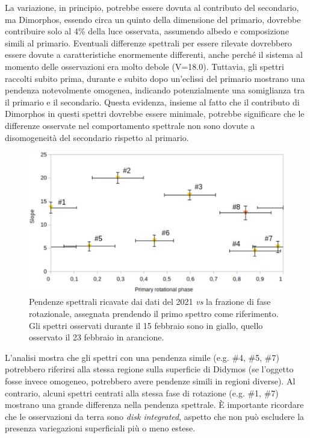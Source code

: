 La variazione, in principio, potrebbe essere dovuta al contributo del secondario, ma Dimorphos, essendo circa un quinto della dimensione del primario, dovrebbe contribuire solo al 4\% della luce osservata, assumendo albedo e composizione simili al primario. Eventuali differenze spettrali per essere rilevate dovrebbero essere dovute a caratteristiche enormemente differenti, anche perché il sistema al momento delle osservazioni era molto debole (V=18.0). Tuttavia, gli spettri raccolti subito prima, durante e subito dopo un'eclissi del primario mostrano una pendenza notevolmente omogenea, indicando potenzialmente una somiglianza tra il primario e il secondario. Questa evidenza, insieme al fatto che il contributo di Dimorphos in questi spettri dovrebbe essere minimale, potrebbe significare che le differenze osservate nel comportamento spettrale non sono dovute a disomogeneità del secondario rispetto al primario.

\begin{figure}[!h]
    \centering
    \includegraphics[scale=0.7]{figure/slope_ieva.jpg}
    \caption[Pendenze spettrali dei dati del 2021.]{Pendenze spettrali ricavate dai dati del 2021 \textit{vs} la frazione di fase rotazionale, assegnata prendendo il primo spettro come riferimento. Gli spettri osservati durante il 15 febbraio sono in giallo, quello osservato il 23 febbraio in arancione. \citep{ieva_spectral_2022}}
    \label{fig:slope_ieva}
\end{figure}

L'analisi mostra che gli spettri con una pendenza simile (e.g. \#4, \#5, \#7) potrebbero riferirsi alla stessa regione sulla superficie di Didymos (se l'oggetto fosse invece omogeneo, potrebbero avere pendenze simili in regioni diverse). Al contrario, alcuni spettri centrati alla stessa fase di rotazione (e.g. \#1, \#7) mostrano una grande differenza nella pendenza spettrale. È importante ricordare che le osservazioni da terra sono \textit{disk integrated}, aspetto che non può escludere la presenza variegazioni superficiali più o meno estese.

